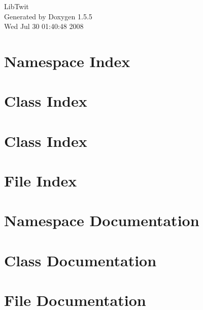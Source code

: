 \documentclass[a4paper]{book}
\begin{document}
\begin{titlepage}
\vspace*{7cm}
\begin{center}
{\Large LibTwit }\\
\vspace*{1cm}
{\large Generated by Doxygen 1.5.5}\\
\vspace*{0.5cm}
{\small Wed Jul 30 01:40:48 2008}\\
\end{center}
\end{titlepage}
\clearemptydoublepage
{}
\tableofcontents
\clearemptydoublepage
{}
\chapter{Namespace Index}

\chapter{Class Index}

\chapter{Class Index}

\chapter{File Index}

\chapter{Namespace Documentation}

\chapter{Class Documentation}









\chapter{File Documentation}







\printindex
\end{document}
